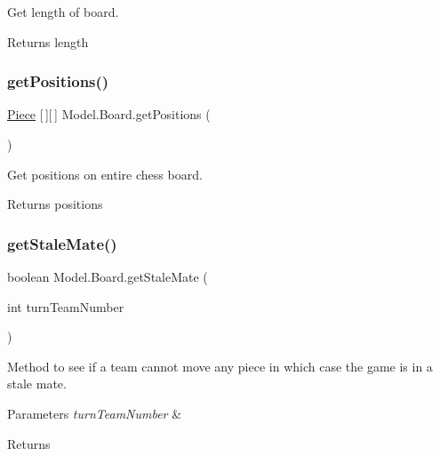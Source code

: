 Get length of board. \begin{DoxyReturn}{Returns}
length 
\end{DoxyReturn}
\hypertarget{class_model_1_1_board_a6d51fda7af5f561f6bd1478e2411d3bd}{}\label{class_model_1_1_board_a6d51fda7af5f561f6bd1478e2411d3bd} 
\subsubsection{\texorpdfstring{get\+Positions()}{getPositions()}}
{\footnotesize\ttfamily \hyperlink{class_model_1_1_pieces_1_1_piece}{Piece} \mbox{[}$\,$\mbox{]}\mbox{[}$\,$\mbox{]} Model.\+Board.\+get\+Positions (\begin{DoxyParamCaption}{ }\end{DoxyParamCaption})}

Get positions on entire chess board. \begin{DoxyReturn}{Returns}
positions 
\end{DoxyReturn}
\hypertarget{class_model_1_1_board_a6a8d2dc192be22d581618ac2b3301966}{}\label{class_model_1_1_board_a6a8d2dc192be22d581618ac2b3301966} 
\subsubsection{\texorpdfstring{get\+Stale\+Mate()}{getStaleMate()}}
{\footnotesize\ttfamily boolean Model.\+Board.\+get\+Stale\+Mate (\begin{DoxyParamCaption}\item[{int}]{turn\+Team\+Number }\end{DoxyParamCaption})}

Method to see if a team cannot move any piece in which case the game is in a stale mate. 
\begin{DoxyParams}{Parameters}
{\em turn\+Team\+Number} & \\
\hline
\end{DoxyParams}
\begin{DoxyReturn}{Returns}

\end{DoxyReturn}
\hypertarget{class_model_1_1_board_afbbd0336890f96410b94a622290db60d}{}\label{class_model_1_1_board_afbbd0336890f96410b94a622290db60d} 
